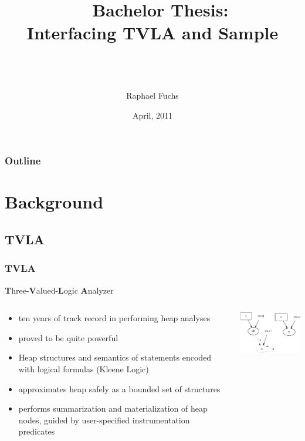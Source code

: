 \documentclass [xcolor=svgnames]{beamer} %
\title[ \hspace{4em}\insertframenumber/
\inserttotalframenumber]{~ {\large Bachelor Thesis:} \\ Interfacing TVLA and Sample\\~} %
\author{ \\ Raphael Fuchs} %
\date{April, 2011}
\begin{document}
\begin{frame}


\maketitle
\end{frame}

\begin{frame}
\frametitle{Outline}
\tableofcontents
\end{frame}

\section{Background}
\subsection{TVLA}
\begin{frame}
\frametitle{TVLA}
\textbf{T}hree-\textbf{V}alued-\textbf{L}ogic \textbf{A}nalyzer
\begin{columns}
  \begin{column}[l]{6cm}
\begin{itemize}
  \item ten years of track record in performing heap analyses
  \item proved to be quite powerful
  \item Heap structures and semantics of statements encoded with logical formulas (Kleene Logic)
  \item approximates heap safely as a bounded set of structures
  \item performs \textcolor{pacificblue}{summarization} and \textcolor{pacificblue}{materialization} of heap nodes, guided by user-specified \textcolor{pacificblue}{instrumentation predicates}
\end{itemize}
\end{column}
\begin{column}[r]{5cm}
\begin{center}
\includegraphics[width=5cm]{list.pdf}
\end{center}
\end{column}
\end{columns}
\end{frame}
\end{document}
